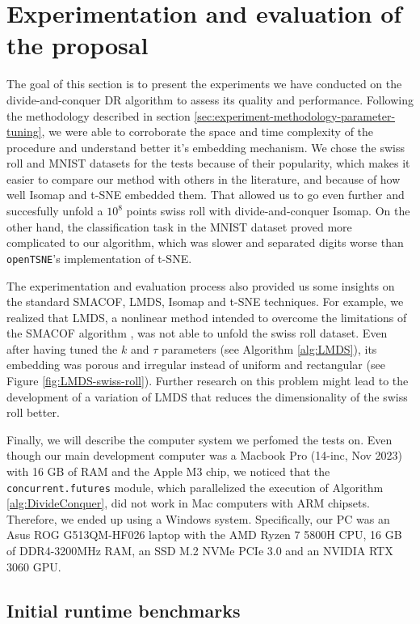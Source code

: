 \section{Experimentation and evaluation of the proposal}
\label{sec:experimentation-and-evaluation}

The goal of this section is to present the experiments we have conducted on the divide-and-conquer DR algorithm to assess its quality and performance. Following the methodology described in section \ref{sec:experiment-methodology-parameter-tuning}, we were able to corroborate the space and time complexity of the procedure and understand better it's embedding mechanism. We chose the swiss roll and MNIST datasets for the tests because of their popularity, which makes it easier to compare our method with others in the literature, and because of how well Isomap and t-SNE embedded them. That allowed us to go even further and succesfully unfold a $10^8$ points swiss roll with divide-and-conquer Isomap. On the other hand, the classification task in the MNIST dataset proved more complicated to our algorithm, which was slower and separated digits worse than \verb|openTSNE|'s implementation of t-SNE.

The experimentation and evaluation process also provided us some insights on the standard SMACOF, LMDS, Isomap and t-SNE techniques. For example, we realized that LMDS, a nonlinear method intended to overcome the limitations of the SMACOF algorithm \citep{Chen2009}, was not able to unfold the swiss roll dataset. Even after having tuned the $k$ and $\tau$ parameters (see Algorithm \ref{alg:LMDS}), its embedding was porous and irregular instead of uniform and rectangular (see Figure \ref{fig:LMDS-swiss-roll}). Further research on this problem might lead to the development of a variation of LMDS that reduces the dimensionality of the swiss roll better.

Finally, we will describe the computer system we perfomed the tests on. Even though our main development computer was a  Macbook Pro (14-inc, Nov 2023) with 16 GB of RAM and the Apple M3 chip, we noticed that the \verb|concurrent.futures| module, which parallelized the execution of Algorithm \ref{alg:DivideConquer}, did not work in Mac computers with ARM chipsets. Therefore, we ended up using a Windows system. Specifically, our PC was an Asus ROG G513QM-HF026 laptop with the AMD Ryzen 7 5800H CPU, 16 GB of DDR4-3200MHz RAM, an SSD M.2 NVMe PCIe 3.0 and an NVIDIA RTX 3060 GPU.

\subsection{Initial runtime benchmarks}


